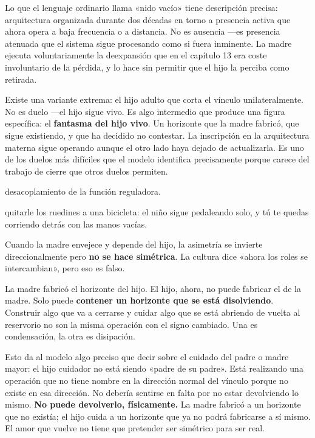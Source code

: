 Lo que el lenguaje ordinario llama «nido vacío» tiene descripción precisa: arquitectura organizada durante dos décadas en torno a presencia activa que ahora opera a baja frecuencia o a distancia. No es ausencia —es presencia atenuada que el sistema sigue procesando como si fuera inminente. La madre ejecuta voluntariamente la deexpansión que en el capítulo 13 era coste involuntario de la pérdida, y lo hace sin permitir que el hijo la perciba como retirada.

Existe una variante extrema: el hijo adulto que corta el vínculo unilateralmente. No es duelo —el hijo sigue vivo. Es algo intermedio que produce una figura específica: el \textbf{fantasma del hijo vivo}. Un horizonte que la madre fabricó, que sigue existiendo, y que ha decidido no contestar. La inscripción en la arquitectura materna sigue operando aunque el otro lado haya dejado de actualizarla. Es uno de los duelos más difíciles que el modelo identifica precisamente porque carece del trabajo de cierre que otros duelos permiten.

\begin{fisica}
 desacoplamiento de la función reguladora.

 quitarle los ruedines a una bicicleta: el niño sigue pedaleando solo, y tú te quedas corriendo detrás con las manos vacías.
\end{fisica}
\noindent Cuando la madre envejece y depende del hijo, la asimetría se invierte direccionalmente pero \textbf{no se hace simétrica}. La cultura dice «ahora los roles se intercambian», pero eso es falso.

La madre fabricó el horizonte del hijo. El hijo, ahora, no puede fabricar el de la madre. Solo puede \textbf{contener un horizonte que se está disolviendo}. Construir algo que va a cerrarse y cuidar algo que se está abriendo de vuelta al reservorio no son la misma operación con el signo cambiado. Una es condensación, la otra es disipación.

Esto da al modelo algo preciso que decir sobre el cuidado del padre o madre mayor: el hijo cuidador no está siendo «padre de su padre». Está realizando una operación que no tiene nombre en la dirección normal del vínculo porque no existe en esa dirección. No debería sentirse en falta por no estar devolviendo lo mismo. \textbf{No puede devolverlo, físicamente.} La madre fabricó a un horizonte que no existía; el hijo cuida a un horizonte que ya no podrá fabricarse a sí mismo. El amor que vuelve no tiene que pretender ser simétrico para ser real.

